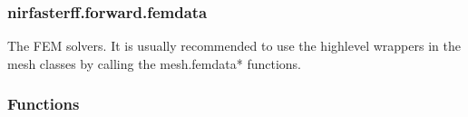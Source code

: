 \documentclass[letterpaper,10pt,english]{sphinxmanual}
\begin{document}
\subsubsection{nirfasterff.forward.femdata}
\label{\detokenize{_autosummary/nirfasterff.forward.femdata:module-nirfasterff.forward.femdata}}\label{\detokenize{_autosummary/nirfasterff.forward.femdata:nirfasterff-forward-femdata}}\label{\detokenize{_autosummary/nirfasterff.forward.femdata::doc}}
\sphinxAtStartPar
The FEM solvers. It is usually recommended to use the high\sphinxhyphen{}level wrappers in the mesh classes by calling the mesh.femdata* functions.
\subsubsection*{Functions}
\end{document}
